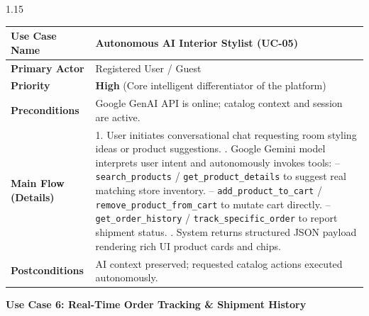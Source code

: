 \documentclass[12pt,a4paper]{article}
\begin{document}
{\begin{spacing}{1.15}
\begin{center}
\renewcommand{\arraystretch}{1.2}
\fontsize{10.5}{14}\selectfont
\begin{tabular}{|p{1.6in}|p{4.9in}|}
\hline
\textbf{Use Case Name} & Autonomous AI Interior Stylist (\textbf{UC-05}) \\ \hline
\textbf{Primary Actor} & Registered User / Guest \\ \hline
\textbf{Priority} & \textbf{High} (Core intelligent differentiator of the platform) \\ \hline
\textbf{Preconditions} & Google GenAI API is online; catalog context and session are active. \\ \hline
\textbf{Main Flow (Details)} &
1. User initiates conversational chat requesting room styling ideas or product suggestions. \newline
2. Google Gemini model interprets user intent and autonomously invokes tools: \newline
   -- \texttt{search\_products} / \texttt{get\_product\_details} to suggest real matching store inventory. \newline
   -- \texttt{add\_product\_to\_cart} / \texttt{remove\_product\_from\_cart} to mutate cart directly. \newline
   -- \texttt{get\_order\_history} / \texttt{track\_specific\_order} to report shipment status. \newline
3. System returns structured JSON payload rendering rich UI product cards and chips. \\ \hline
\textbf{Postconditions} & AI context preserved; requested catalog actions executed autonomously. \\ \hline
\end{tabular}
\end{center}

\vspace{0.08in}

\noindent
\textbf{Use Case 6: Real-Time Order Tracking \& Shipment History}

\vspace{0.04in}


\end{spacing}}
\end{document}
